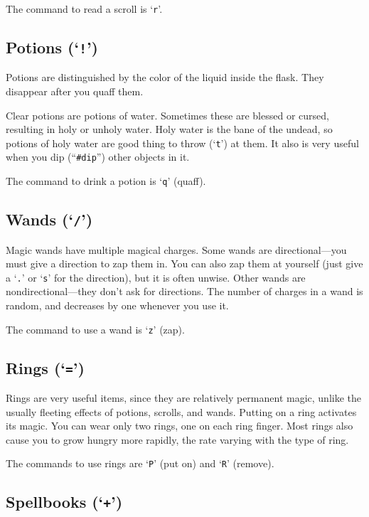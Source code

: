 The command to read a scroll is `{\tt r}'.

\subsection{Potions (`{\tt !}')}

Potions are distinguished by the color of the liquid inside the flask.
They disappear after you quaff them.

Clear potions are potions of water.  Sometimes these are
blessed or cursed, resulting in holy or unholy water.  Holy water is
the bane of the undead, so potions of holy water are good thing to
throw (`{\tt t}') at them.  It also is very useful when you dip
(``{\tt \#dip}'') other
objects in it.

The command to drink a potion is `{\tt q}' (quaff).

\subsection*{Wands (`{\tt /}')}

Magic wands have multiple magical charges.  Some wands are
directional---you must give a direction to zap them in.  You can also
zap them at yourself (just give a `{\tt .}' or `{\tt s}' for the direction),
but it is often unwise.  Other wands are nondirectional---they don't ask
for directions.  The number of charges in a wand is random, and
decreases by one whenever you use it.

The command to use a wand is `{\tt z}' (zap).

\subsection*{Rings (`{\tt =}')}

Rings are very useful items, since they are relatively permanent
magic, unlike the usually fleeting effects of potions, scrolls, and
wands.
Putting on a ring activates its magic.  You can wear only two
rings, one on each ring finger.
Most rings also cause you to grow hungry more rapidly, the rate
varying with the type of ring.

The commands to use rings are `{\tt P}' (put on) and `{\tt R}' (remove).

\subsection*{Spellbooks (`{\tt +}')}

